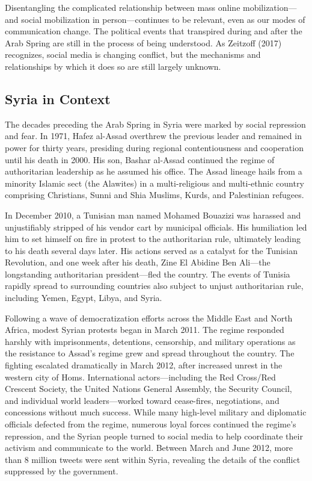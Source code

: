 \documentclass[
  english,
  man]{apa6}
\begin{document}
Disentangling the complicated relationship between mass online
mobilization---and social mobilization in person---continues to be relevant,
even as our modes of communication change. The political events that
transpired during and after the Arab Spring are still in the process of being
understood. As Zeitzoff (2017) recognizes, social media is
changing conflict, but the mechanisms and relationships by which it does so are
still largely unknown.

\hypertarget{syria-in-context}{%
\subsection{Syria in Context}\label{syria-in-context}}

The decades preceding the Arab Spring in Syria were marked by
social repression and fear. In 1971, Hafez al-Assad overthrew the previous
leader and remained in power for thirty years, presiding during
regional contentiousness and cooperation until his death in 2000. His son,
Bashar al-Assad continued the regime of authoritarian leadership as he assumed
his office. The Assad lineage hails from a minority Islamic sect (the Alawites)
in a multi-religious and multi-ethnic country comprising Christians, Sunni and
Shia Muslims, Kurds, and Palestinian refugees.

In December 2010, a Tunisian man named Mohamed Bouazizi was harassed and
unjustifiably stripped of his vendor cart by municipal officials. His
humiliation led him to set himself on fire in protest to the authoritarian rule,
ultimately leading to his death several days later. His actions served as a
catalyst for the Tunisian Revolution, and one week after his death, Zine El
Abidine Ben Ali---the longstanding authoritarian president---fled the country.
The events of Tunisia rapidly spread to surrounding countries also subject to
unjust authoritarian rule, including Yemen, Egypt, Libya, and Syria.

Following a wave of democratization efforts across the Middle East and North
Africa, modest Syrian protests began in March 2011. The regime responded harshly
with imprisonments, detentions, censorship, and military operations as the
resistance to Assad's regime grew and spread throughout the country. The
fighting escalated dramatically in March 2012, after increased unrest in the
western city of Homs. International actors---including the Red Cross/Red
Crescent Society, the United Nations General Assembly, the Security Council, and
individual world leaders---worked toward cease-fires, negotiations, and
concessions without much success. While many high-level military and diplomatic
officials defected from the regime, numerous loyal forces continued the regime's
repression, and the Syrian people turned to social media to help coordinate
their activism and communicate to the world. Between March and June 2012, more
than 8 million tweets were sent within Syria, revealing the details of the
conflict suppressed by the government.
\end{document}
